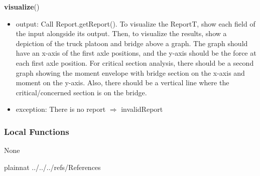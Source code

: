 \documentclass[12pt, titlepage]{article}
\begin{document}
\noindent \textbf{visualize}()
\begin{itemize}
\item output: Call Report.getReport(). To visualize the ReportT, show each field of the input alongside its output. Then, to visualize the results, show a depiction of the truck platoon and bridge above a graph. The graph should have an x-axis of the first axle positions, and the y-axis should be the force at each first axle position. For critical section analysis, there should be a second graph showing the moment envelope with bridge section on the x-axis and moment on the y-axis. Also, there should be a vertical line where the critical/concerned section is on the bridge. 
\item exception: There is no report $\Rightarrow$ invalidReport
\end{itemize}
\subsubsection{Local Functions}
None

\newpage

 {plainnat}
 {../../../refs/References}
\end{document}
